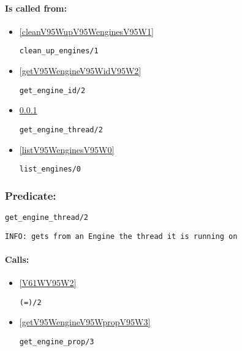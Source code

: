 \paragraph{Is called from:} 
\begin{itemize}
\item \ref{cleanV95WupV95WenginesV95W1} 
\begin{verbatim}
clean_up_engines/1
\end{verbatim}

\item \ref{getV95WengineV95WidV95W2} 
\begin{verbatim}
get_engine_id/2
\end{verbatim}

\item \ref{getV95WengineV95WthreadV95W2} 
\begin{verbatim}
get_engine_thread/2
\end{verbatim}

\item \ref{listV95WenginesV95W0} 
\begin{verbatim}
list_engines/0
\end{verbatim}

\end{itemize}

\subsubsection{Predicate:} \label{getV95WengineV95WthreadV95W2}

\begin{verbatim}
get_engine_thread/2
\end{verbatim}

{\small \begin{verbatim}
INFO: gets from an Engine the thread it is running on

\end{verbatim}}
\paragraph{Calls:} 
\begin{itemize}
\item \ref{V61WV95W2} 
\begin{verbatim}
(=)/2
\end{verbatim}

\item \ref{getV95WengineV95WpropV95W3} 
\begin{verbatim}
get_engine_prop/3
\end{verbatim}

\end{itemize}
